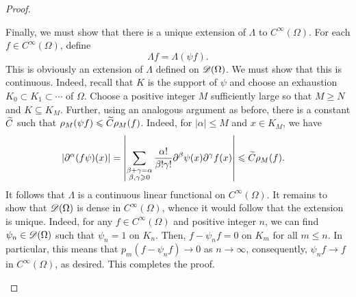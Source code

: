 \begin{proof}
\begin{enumerate}[label=(\alph*)]
    Finally, we must show that there is a unique extension of $\Lambda$ to $C^\infty(\Omega)$. For each $f\in C^\infty(\Omega)$, define 
    \begin{equation*}
        \Lambda f = \Lambda(\psi f).
    \end{equation*}
    This is obviously an extension of $\Lambda$ defined on $\mathscr{D}(\Omega)$. We must show that this is continuous. Indeed, recall that $K$ is the support of $\psi$ and choose an exhaustion $K_0\subset K_1\subset\cdots$ of $\Omega$. Choose a positive integer $M$ sufficiently large so that $M\ge N$ and $K\subseteq K_M$. Further, using an analogous argument as before, there is a constant $\widetilde{C}$ such that $\rho_M(\psi f)\leqslant\widetilde{C}\rho_M(f)$. Indeed, for $|\alpha|\le M$ and $x\in K_M$, we have 
    \begin{align*}
        \left|\partial^\alpha(f\psi)(x)\right| &= \left|\sum_{\substack{\beta + \gamma = \alpha\\\beta,\gamma\geqslant 0}}\frac{\alpha!}{\beta!\gamma!}\partial^\beta \psi(x)\partial^\gamma f(x)\right|\leqslant\widetilde{C}\rho_M(f).
    \end{align*}
    It follows that $\Lambda$ is a continuous linear functional on $C^\infty(\Omega)$. It remains to show that $\mathscr{D}(\Omega)$ is dense in $C^\infty(\Omega)$, whence it would follow that the extension is unique. Indeed, for any $f\in C^\infty(\Omega)$ and positive integer $n$, we can find $\psi_n\in\mathscr{D}(\Omega)$ such that $\psi_n = 1$ on $K_n$. Then, $f - \psi_nf = 0$ on $K_m$ for all $m\le n$. In particular, this means that $p_m(f - \psi_nf) \to 0$ as $n\to\infty$, consequently, $\psi_nf\to f$ in $C^\infty(\Omega)$, as desired. This completes the proof.\qedhere
\end{enumerate}
\end{proof}